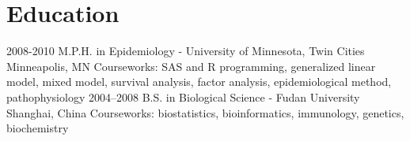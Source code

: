 
\section{Education}

\begin{entrylist}
  \entry
    {2008-2010}
    {M.P.H. in Epidemiology - University of Minnesota, Twin Cities}
    {Minneapolis, MN}
    {Courseworks: SAS and R programming, generalized linear model, mixed model, survival analysis, factor analysis, epidemiological method, pathophysiology}
  \entry
    {2004–2008}
    {B.S. in Biological Science - Fudan University}
    {Shanghai, China}
    {Courseworks: biostatistics, bioinformatics, immunology, genetics, biochemistry}
\end{entrylist}
